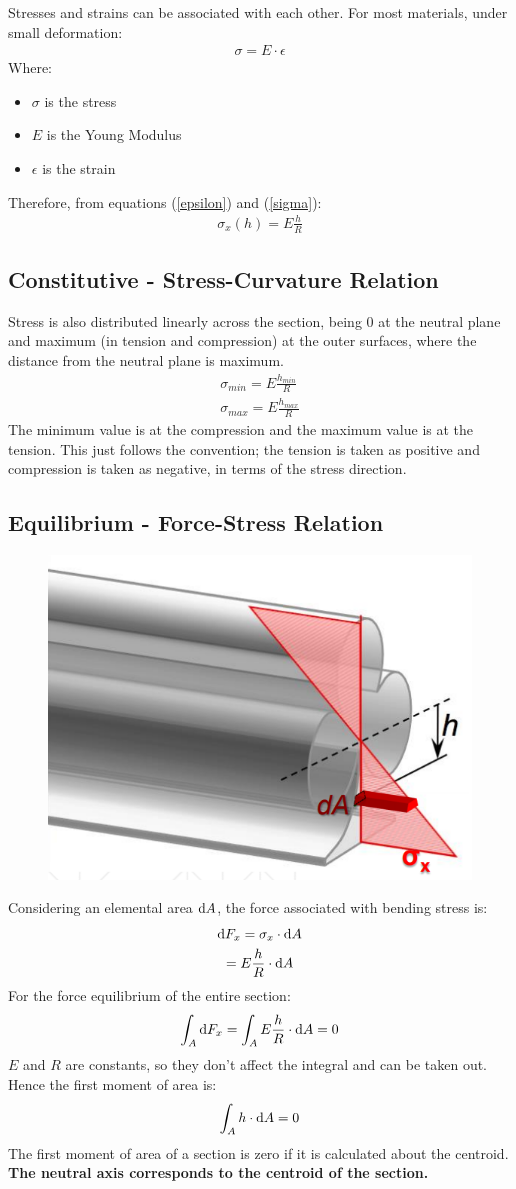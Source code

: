 \documentclass[class=report, crop=false, 12pt,a4paper]{standalone}
\begin{document}
Stresses and strains can be associated with each other. For most materials, under small deformation:
\begin{gather}
  \sigma = E\cdot \epsilon
  \label{sigma}
\end{gather}
Where:
\begin{itemize}[noitemsep]
  \item $\sigma$ is the stress
  \item $E$ is the Young Modulus
  \item $\epsilon$ is the strain
\end{itemize}
Therefore, from equations (\ref{epsilon}) and (\ref{sigma}):
\begin{gather}
  \sigma_x(h) = E\frac{h}{R}
\end{gather}
\subsection{Constitutive - Stress-Curvature Relation}
Stress is also distributed linearly across the section, being 0 at the neutral plane and maximum (in tension and compression) at the outer surfaces, where the distance from the neutral plane is maximum. 
\begin{gather}
  \sigma_{min} = E\frac{h_{min}}{R} \\
  \sigma_{max} = E\frac{h_{max}}{R}
\end{gather}
The minimum value is at the compression and the maximum value is at the tension. This just follows the convention; the tension is taken as positive and compression is taken as negative, in terms of the stress direction.
\subsection{Equilibrium - Force-Stress Relation}
\begin{figure}[H]
  \centering
  \includegraphics[width = 0.3 \textwidth]{../img/forcestressrelation.PNG}
\end{figure}
Considering an elemental area $\dif A$, the force associated with bending stress is:
\begin{gather}
  \dif F_x = \sigma_x \cdot \dif A \\
  = E\frac{h}{R}\cdot \dif A
\end{gather}
For the force equilibrium of the entire section: 
\begin{gather}
  \int_{A}\dif F_x = \int_{A} E\frac{h}{R}\cdot \dif A = 0 \\ 
\end{gather}
$E$ and $R$ are constants, so they don't affect the integral and can be taken out. Hence the first moment of area is:
\begin{gather}
  \int_{A} h\cdot \dif A = 0
\end{gather}
The first moment of area of a section is zero if it is calculated about the centroid. \textbf{The neutral axis corresponds to the centroid of the section.}
\end{document}
